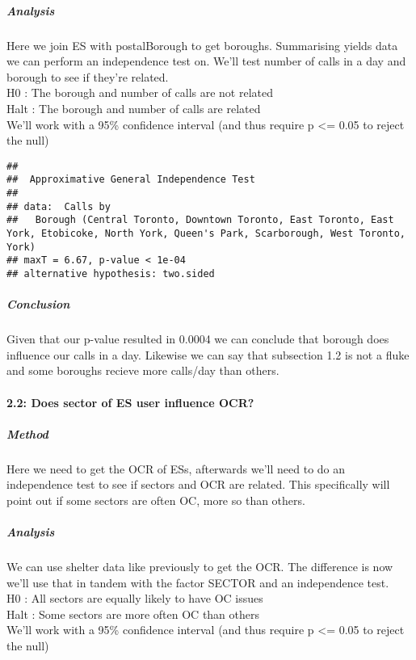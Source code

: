 \documentclass[
]{article}
\begin{document}
\hypertarget{analysis-3}{%
\subparagraph{Analysis}\label{analysis-3}}

Here we join ES with postalBorough to get boroughs. Summarising yields
data we can perform an independence test on. We'll test number of calls
in a day and borough to see if they're related.\\
H0 : The borough and number of calls are not related\\
Halt : The borough and number of calls are related\\
We'll work with a 95\% confidence interval (and thus require p
\textless= 0.05 to reject the null)

\begin{verbatim}
## 
##  Approximative General Independence Test
## 
## data:  Calls by
##   Borough (Central Toronto, Downtown Toronto, East Toronto, East York, Etobicoke, North York, Queen's Park, Scarborough, West Toronto, York)
## maxT = 6.67, p-value < 1e-04
## alternative hypothesis: two.sided
\end{verbatim}

\hypertarget{conclusion-3}{%
\subparagraph{Conclusion}\label{conclusion-3}}

Given that our p-value resulted in 0.0004 we can conclude that borough
does influence our calls in a day. Likewise we can say that subsection
1.2 is not a fluke and some boroughs recieve more calls/day than others.

\hypertarget{does-sector-of-es-user-influence-ocr}{%
\paragraph{2.2: Does sector of ES user influence
OCR?}\label{does-sector-of-es-user-influence-ocr}}

\hypertarget{method-4}{%
\subparagraph{Method}\label{method-4}}

Here we need to get the OCR of ESs, afterwards we'll need to do an
independence test to see if sectors and OCR are related. This
specifically will point out if some sectors are often OC, more so than
others.

\hypertarget{analysis-4}{%
\subparagraph{Analysis}\label{analysis-4}}

We can use shelter data like previously to get the OCR. The difference
is now we'll use that in tandem with the factor SECTOR and an
independence test.\\
H0 : All sectors are equally likely to have OC issues\\
Halt : Some sectors are more often OC than others\\
We'll work with a 95\% confidence interval (and thus require p
\textless= 0.05 to reject the null)
\end{document}
